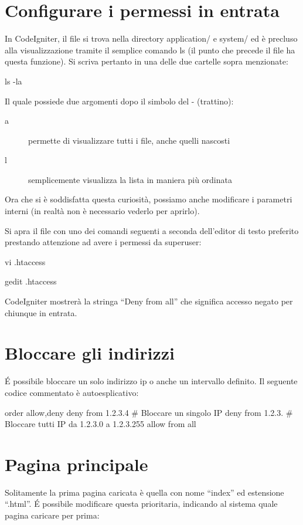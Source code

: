 \section{Configurare i permessi in entrata}
In CodeIgniter, il file  si trova nella directory application/ e system/ ed è precluso alla visualizzazione tramite il semplice comando ls (il punto che precede il file ha questa funzione). Si scriva pertanto in una delle due cartelle sopra menzionate:

\begin{code}
ls -la
\end{code}

Il quale possiede due argomenti dopo il simbolo del - (trattino):

\begin{description}
\item[a] permette di visualizzare tutti i file, anche quelli nascosti
\item[l] semplicemente visualizza la lista in maniera più ordinata
\end{description}

Ora che si è soddisfatta questa curiosità, possiamo anche modificare i parametri interni (in realtà non è necessario vederlo per aprirlo).

Si apra il file con uno dei comandi seguenti a seconda dell'editor di testo  preferito prestando attenzione ad avere i permessi da superuser:

\begin{description}
\item vi .htaccess
\item gedit .htaccess
\end{description}

CodeIgniter mostrerà la stringa ``Deny from all'' che significa accesso negato per chiunque in entrata.

\section{Bloccare gli indirizzi}
\'E possibile bloccare un solo indirizzo ip o anche un intervallo definito. Il seguente codice commentato è autoesplicativo:

\begin{code}
order allow,deny
deny from 1.2.3.4           # Bloccare un singolo IP
deny from 1.2.3.            # Bloccare tutti IP da 1.2.3.0 a 1.2.3.255
allow from all
\end{code}

\section{Pagina principale}
Solitamente la prima pagina caricata è quella con nome ``index'' ed estensione ``.html''. \'E possibile modificare questa prioritaria, indicando al sistema quale pagina caricare per prima:

